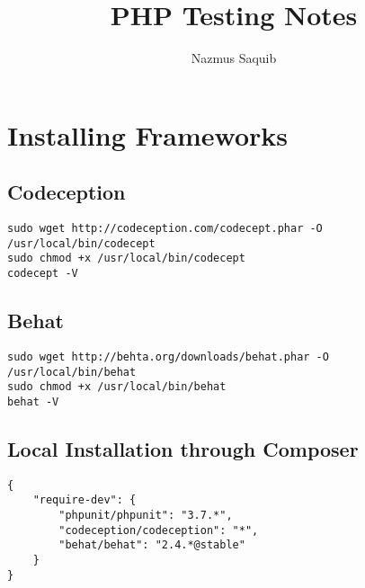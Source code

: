 \documentclass[a4paper, 12pt]{article}
\begin{document}
\title{PHP Testing Notes}
\author{Nazmus Saquib}

\maketitle
\tableofcontents

\section{Installing Frameworks}
\subsection{Codeception}
\begin{verbatim}
sudo wget http://codeception.com/codecept.phar -O /usr/local/bin/codecept
sudo chmod +x /usr/local/bin/codecept
codecept -V
\end{verbatim}
\subsection{Behat}
\begin{verbatim}
sudo wget http://behta.org/downloads/behat.phar -O /usr/local/bin/behat
sudo chmod +x /usr/local/bin/behat
behat -V
\end{verbatim}
\subsection{Local Installation through Composer}
\begin{verbatim}
{
	"require-dev": {
		"phpunit/phpunit": "3.7.*",
		"codeception/codeception": "*",
		"behat/behat": "2.4.*@stable"
	}
}
\end{verbatim}
\end{document}
